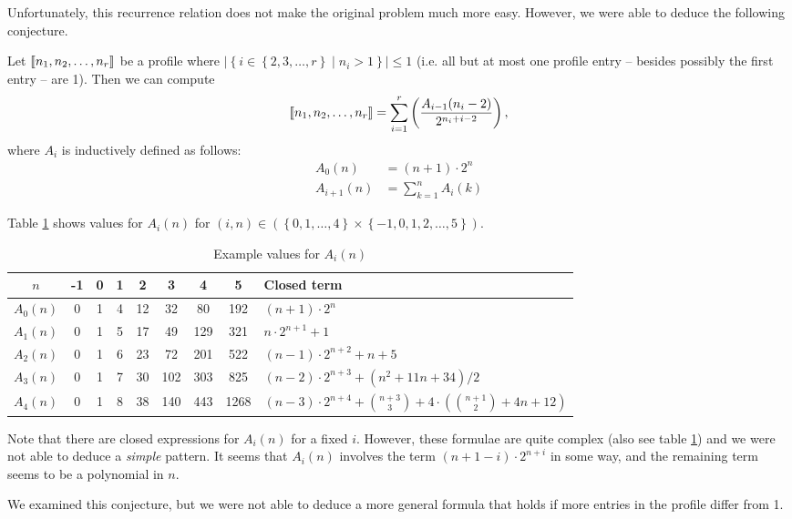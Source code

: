 Unfortunately, this recurrence relation does not make the original problem much more easy. However, we were able to deduce the following conjecture.

\begin{conjecture}
  Let $\llbracket n_1,n_2,\dots,n_r \rrbracket$ be a profile where 
  $\left|\left\{ i \in \left\{ 2,3,\dots,r \right\} \mid n_i > 1 \right\}\right| \leq 1$ 
  (i.e. all but at most one profile entry -- besides possibly the first entry -- are 1).
  Then we can compute 
  \begin{equation*}
    \llbracket n_1,n_2,\dots,n_r \rrbracket = \sum_{i=1}^r \left( \frac{A_{i-1}(n_i - 2)}{2^{n_i+i-2}} \right),
  \end{equation*}
  where $A_i$ is inductively defined as follows:
  \begin{align*}
    A_0(n) & = (n+1) \cdot 2^n \\
    A_{i+1}(n) & = \sum_{k=1}^n A_{i}(k)
  \end{align*}
\end{conjecture}

Table \ref{tab:example-values-an-p2-profile} shows values for $A_i(n)$ for $(i,n) \in \left( \left\{ 0,1,\dots,4 \right\} \times \left\{ -1,0,1,2,\dots,5 \right\} \right)$.

\begin{table}[ht]
  \centering
  \begin{tabular}[ht]{ccccccccl}
    $n$ & -1 & 0 & 1 & 2 & 3 & 4 & 5 & Closed term \\
    \hline
    $A_0(n)$ & 0 & 1 & 4 & 12 & 32 & 80 & 192 & 
    $(n+1)\cdot 2^{n}$ \\
    $A_1(n)$ & 0 & 1 & 5 & 17 & 49 & 129 & 321 & 
    $n\cdot 2^{n+1} + 1$ \\
    $A_2(n)$ & 0 & 1 & 6 & 23 & 72 & 201& 522 & 
    $(n-1)\cdot 2^{n+2}+n+5$ \\
    $A_3(n)$ & 0 & 1 & 7 & 30 & 102 & 303 & 825 & 
    $(n-2)\cdot 2^{n+3}+(n^2+11 n+34)/2$ \\
    $A_4(n)$ & 0 & 1 & 8 & 38 & 140 & 443 & 1268 &
    $(n-3)\cdot2^{n+4}+\binom{n+3}{3}+4\cdot\left(\binom{n+1}{2}+4 n+12\right)$ \\
  \end{tabular}
  \caption{Example values for $A_i(n)$}
  \label{tab:example-values-an-p2-profile}
\end{table}

Note that there are closed expressions for $A_i(n)$ for a fixed $i$. However, these formulae are quite complex (also see table \ref{tab:example-values-an-p2-profile}) and we were not able to deduce a \emph{simple} pattern. It seems that $A_i(n)$ involves the term $(n+1-i)\cdot 2^{n+i}$ in some way, and the remaining term seems to be a polynomial in $n$.

We examined this conjecture, but we were not able to deduce a more general formula that holds if more entries in the profile differ from 1.

